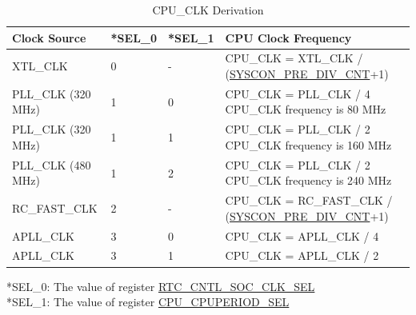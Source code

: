 \documentclass[main\_\_EN.tex]{subfiles}
\begin{document}
\vspace{-1em}
\begin{longtable}[c]{|l|l|l|m{10cm}|}
	\caption{CPU\_CLK Derivation}
    \label{table:cpu clk}
        \\\hline
        \rowcolor{lightgray}
        Clock Source & *SEL\_0 & *SEL\_1 & CPU Clock Frequency \\
        \hline
		XTL\_CLK & 0  & -  & CPU\_CLK = XTL\_CLK / (\hyperref[fielddesc:SYSCONPREDIVCNT]{SYSCON\_PRE\_DIV\_CNT}+1)\\
        \hline
       PLL\_CLK (320 MHz) & 1 &  0 & CPU\_CLK = PLL\_CLK / 4 \newline
         		CPU\_CLK frequency is 80 MHz \\
        \hline
       PLL\_CLK (320 MHz) & 1 &  1   & CPU\_CLK = PLL\_CLK / 2 \newline
       			CPU\_CLK frequency is 160 MHz \\
        \hline
         PLL\_CLK (480 MHz) & 1 & 2 & CPU\_CLK = PLL\_CLK / 2 \newline
       			CPU\_CLK frequency is 240 MHz
       			\\\hline
      RC\_FAST\_CLK  & 2 & -   & CPU\_CLK = RC\_FAST\_CLK / (\hyperref[fielddesc:SYSCONPREDIVCNT]{SYSCON\_PRE\_DIV\_CNT}+1) \\
        \hline
        APLL\_CLK & 3 & 0  & CPU\_CLK = APLL\_CLK / 4 \\
        \hline
         APLL\_CLK & 3 & 1 & CPU\_CLK = APLL\_CLK / 2 \\
        \hline
    \end{longtable}
    \vspace{-1em}
*SEL\_0: The value of register \hyperref[regdesc:RTCCNTLSOCCLKSEL]{RTC\_CNTL\_SOC\_CLK\_SEL}  \\
*SEL\_1: The value of register \hyperref[fielddesc:CPUCPUPERIODSEL]{CPU\_CPUPERIOD\_SEL}
\end{document}
